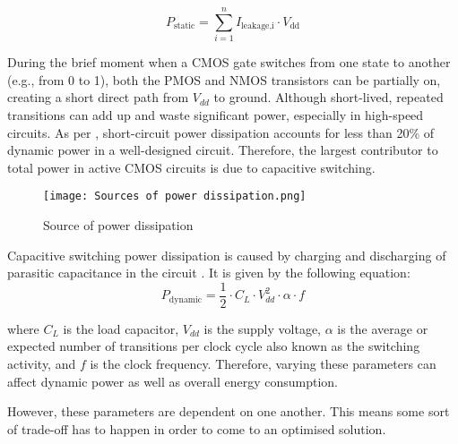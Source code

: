 \documentclass[conference]{IEEEtran}
\begin{document}
\begin{equation}
\label{eq:2.2}
P_{\text{static}} = \sum_{i=1}^{n} I_{\text{leakage,i}} \cdot V_{\text{dd}}
\end{equation}

During the brief moment when a CMOS gate switches from one state to another (e.g., from 0 to 1), both the PMOS and NMOS transistors can be partially on, creating a short direct path from $V_{dd}$ to ground. Although short-lived, repeated transitions can add up and waste significant power, especially in high-speed circuits. As per \cite{1052168}, short-circuit power dissipation accounts for less than 20\% of dynamic power in a well-designed circuit. Therefore, the largest contributor to total power in active CMOS circuits is due to capacitive switching.

\begin{figure}[h!]
    \centering
    \texttt{[image: Sources of power dissipation.png]}
    \caption{Source of power dissipation}
    \label{fig:source of power dissipation}
\end{figure}

Capacitive switching power dissipation is caused by charging and discharging of parasitic capacitance in the circuit \cite{Saraju01}. It is given by the following equation:
\begin{equation}
P_{\text{dynamic}} = \frac{1}{2} \cdot C_L \cdot V_{dd}^2 \cdot \alpha \cdot f
\label{eq: powereq}
\end{equation}


where $C_L$ is the load capacitor, $V_{dd}$ is the supply voltage, $α$ is the average or expected number of transitions per clock cycle also known as the switching activity, and $f$ is the clock frequency. Therefore, varying these parameters can affect dynamic power as well as overall energy consumption. 

However, these parameters are dependent on one another. This means some sort of trade-off has to happen in order to come to an optimised solution. 

\end{document}
